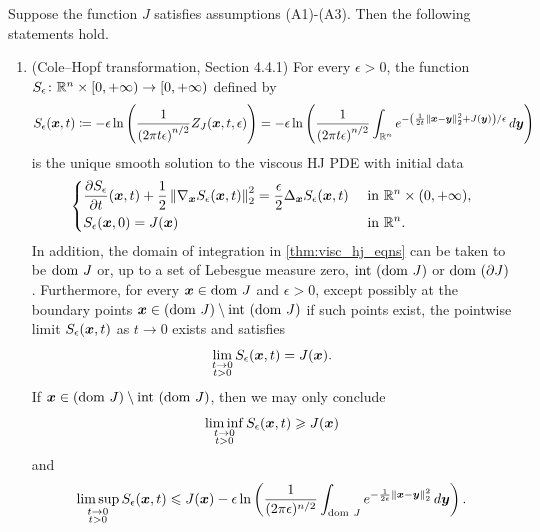 \begin{prop} \label{thm:visc_hj_eqns} Suppose the function $J$ satisfies assumptions (A1)-(A3). Then the following statements hold.
\begin{enumerate}
\item[(i)] (Cole--Hopf transformation, \cite{evans1998partial} Section 4.4.1) For every $\epsilon>0$, the function $S_\epsilon\colon\mathbb{R}^n\times[0,+\infty)\to[0,+\infty)$ defined by
\begin{equation} \label{eq:hj_s_eps}
S_{\epsilon}(\boldsymbol{x},t)\coloneqq-\epsilon\ln\left(\frac{1}{\left(2\pi t\epsilon\right)^{n/2}}Z_J(\boldsymbol{x},t,\epsilon)\right)=-\epsilon\ln\left(\frac{1}{\left(2\pi t\epsilon\right)^{n/2}}\int_{\mathbb{R}^n}e^{-\left(\frac{1}{2t}\left\Vert \boldsymbol{x}-\boldsymbol{y}\right\Vert _{2}^{2}+J(\boldsymbol{y})\right)/\epsilon}\mathop{}\!d\boldsymbol{y}\right)
\end{equation}
is the unique smooth solution to the viscous HJ PDE with initial data
\begin{equation}
\begin{dcases}\label{eq:hj_visc_pde}
\frac{\partial S_{\epsilon}}{\partial t}(\boldsymbol{x},t)+\frac{1}{2}\left\Vert \nabla_{\boldsymbol{x}}S_{\epsilon}(\boldsymbol{x},t)\right\Vert _{2}^{2}=\frac{\epsilon}{2}\Delta_{\boldsymbol x} S_{\epsilon}(\boldsymbol{x},t) & \text{ in }\mathbb{R}^n\times(0,+\infty),\\
S_{\epsilon}(\boldsymbol{x},0)=J(\boldsymbol{x}) & \text{ in }\mathbb{R}^n.
\end{dcases}
\end{equation}
In addition, the domain of integration in \eqref{thm:visc_hj_eqns} can be taken to be $\mathrm{dom~} J$ or, up to a set of Lebesgue measure zero, $\mathrm{int~}(\mathrm{dom~} J)$ or $\mathrm{dom~}(\partial J)$. Furthermore, for every $\boldsymbol{x}\in\mathrm{dom~} J$ and $\epsilon > 0$, except possibly at the boundary points $\boldsymbol{x}\in(\mathrm{dom~} J)\setminus\mathrm{int~}(\mathrm{dom~} J)$ if such points exist, the pointwise limit $S_\epsilon(\boldsymbol{x},t)$ as $t \to 0$ exists and satisfies 
\begin{equation}
    \lim_{\substack{t\to0\\t>0}}S_{\epsilon}(\boldsymbol{x},t)=J(\boldsymbol{x}).
\end{equation}
If $\boldsymbol{x}\in(\mathrm{dom~} J)\setminus\mathrm{int~}(\mathrm{dom~} J)$, then we may only conclude 
\[
\liminf_{\substack{t\to0\\t>0}}S_{\epsilon}(\boldsymbol{x},t)\geqslant J(\boldsymbol{x})
\]
 and 
\[\limsup_{\substack{t\to0\\t>0}}S_{\epsilon}(\boldsymbol{x},t)\leqslant J(\boldsymbol{x})-\epsilon\ln\left(\frac{1}{(2\pi\epsilon)^{n/2}}\int_{\mathrm{dom~} J}e^{-\frac{1}{2\epsilon}\left\Vert \boldsymbol{x}-\boldsymbol{y}\right\Vert _{2}^{2}}\mathop{}\!d\boldsymbol{y}\right).
\]


\end{enumerate}
\end{prop}
